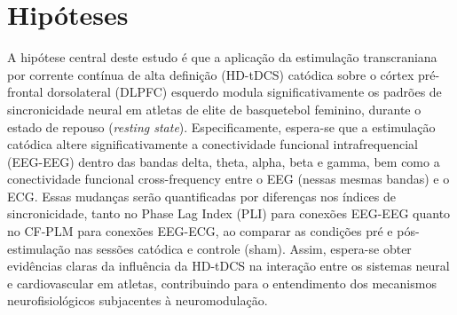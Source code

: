 \chapter{Hipóteses}
\label{chap:hipoteses}

A hipótese central deste estudo é que a aplicação da estimulação transcraniana por corrente contínua de alta definição (HD-tDCS) catódica sobre o córtex pré-frontal dorsolateral (DLPFC) esquerdo modula significativamente os padrões de sincronicidade neural em atletas de elite de basquetebol feminino, durante o estado de repouso (\textit{resting state}). Especificamente, espera-se que a estimulação catódica altere significativamente a conectividade funcional intrafrequencial (EEG-EEG) dentro das bandas delta, theta, alpha, beta e gamma, bem como a conectividade funcional cross-frequency entre o EEG (nessas mesmas bandas) e o ECG. Essas mudanças serão quantificadas por diferenças nos índices de sincronicidade, tanto no Phase Lag Index (PLI) para conexões EEG-EEG quanto no CF-PLM para conexões EEG-ECG, ao comparar as condições pré e pós-estimulação nas sessões catódica e controle (sham). Assim, espera-se obter evidências claras da influência da HD-tDCS na interação entre os sistemas neural e cardiovascular em atletas, contribuindo para o entendimento dos mecanismos neurofisiológicos subjacentes à neuromodulação.